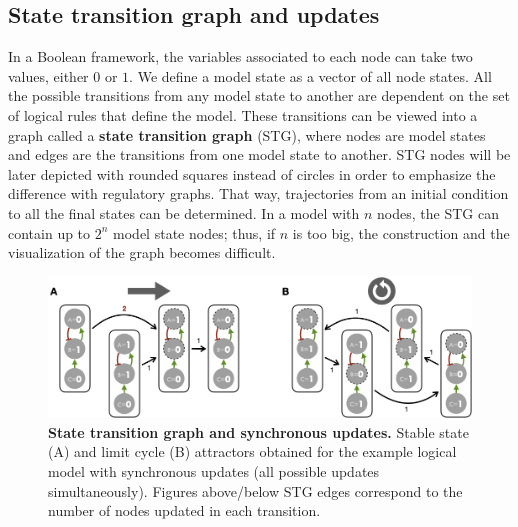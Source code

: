 \documentclass[a4paper,12pt,twoside,onecolumn,openright,final,oldfontcommands]{memoir}
\begin{document}
\subsection{State transition graph and
updates}\label{state-transition-graph-and-updates}

In a Boolean framework, the variables associated to each node can take
two values, either \(0\) or \(1\). We define a model state as a vector
of all node states. All the possible transitions from any model state to
another are dependent on the set of logical rules that define the model.
These transitions can be viewed into a graph called a \textbf{state
transition graph} (STG), where nodes are model states and edges are the
transitions from one model state to another. STG nodes will be later
depicted with rounded squares instead of circles in order to emphasize
the difference with regulatory graphs. That way, trajectories from an
initial condition to all the final states can be determined. In a model
with \(n\) nodes, the STG can contain up to \(2^n\) model state nodes;
thus, if \(n\) is too big, the construction and the visualization of the
graph becomes difficult.

\begin{figure}

{\centering \includegraphics[width=0.9\linewidth]{fig/synchronous} 

}

\caption[A simple example of a logical model]{\textbf{State transition graph and synchronous
updates.} Stable state (A) and limit cycle (B) attractors obtained for
the example logical model with synchronous updates (all possible updates
simultaneously). Figures above/below STG edges correspond to the number
of nodes updated in each transition.}\label{fig:synchronous}
\end{figure}
\end{document}

